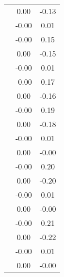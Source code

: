 \begin{table}
\begin{tabular}{c|cc|}
\multicolumn{1}{|c|}{} & \multicolumn{1}{|c|}{      0.00} & \multicolumn{1}{|c|}{     -0.13} \\ 
\multicolumn{1}{|c|}{} & \multicolumn{1}{|c|}{     -0.00} & \multicolumn{1}{|c|}{      0.01} \\ 
\multicolumn{1}{|c|}{} & \multicolumn{1}{|c|}{     -0.00} & \multicolumn{1}{|c|}{      0.15} \\ 
\multicolumn{1}{|c|}{} & \multicolumn{1}{|c|}{      0.00} & \multicolumn{1}{|c|}{     -0.15} \\ 
\multicolumn{1}{|c|}{} & \multicolumn{1}{|c|}{     -0.00} & \multicolumn{1}{|c|}{      0.01} \\ 
\multicolumn{1}{|c|}{} & \multicolumn{1}{|c|}{     -0.00} & \multicolumn{1}{|c|}{      0.17} \\ 
\multicolumn{1}{|c|}{} & \multicolumn{1}{|c|}{      0.00} & \multicolumn{1}{|c|}{     -0.16} \\ 
\multicolumn{1}{|c|}{} & \multicolumn{1}{|c|}{     -0.00} & \multicolumn{1}{|c|}{      0.19} \\ 
\multicolumn{1}{|c|}{} & \multicolumn{1}{|c|}{      0.00} & \multicolumn{1}{|c|}{     -0.18} \\ 
\multicolumn{1}{|c|}{} & \multicolumn{1}{|c|}{     -0.00} & \multicolumn{1}{|c|}{      0.01} \\ 
\multicolumn{1}{|c|}{} & \multicolumn{1}{|c|}{      0.00} & \multicolumn{1}{|c|}{     -0.00} \\ 
\multicolumn{1}{|c|}{} & \multicolumn{1}{|c|}{     -0.00} & \multicolumn{1}{|c|}{      0.20} \\ 
\multicolumn{1}{|c|}{} & \multicolumn{1}{|c|}{      0.00} & \multicolumn{1}{|c|}{     -0.20} \\ 
\multicolumn{1}{|c|}{} & \multicolumn{1}{|c|}{     -0.00} & \multicolumn{1}{|c|}{      0.01} \\ 
\multicolumn{1}{|c|}{} & \multicolumn{1}{|c|}{      0.00} & \multicolumn{1}{|c|}{     -0.00} \\ 
\multicolumn{1}{|c|}{} & \multicolumn{1}{|c|}{     -0.00} & \multicolumn{1}{|c|}{      0.21} \\ 
\multicolumn{1}{|c|}{} & \multicolumn{1}{|c|}{      0.00} & \multicolumn{1}{|c|}{     -0.22} \\ 
\multicolumn{1}{|c|}{} & \multicolumn{1}{|c|}{     -0.00} & \multicolumn{1}{|c|}{      0.01} \\ 
\multicolumn{1}{|c|}{} & \multicolumn{1}{|c|}{      0.00} & \multicolumn{1}{|c|}{     -0.00} \\ 

\end{tabular}
\end{table}
